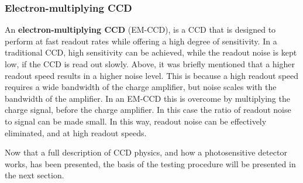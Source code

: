 \documentclass[../main.tex]{subfiles}
\begin{document}
	
	
	\subsubsection{Electron-multiplying CCD}
	An \textbf{electron-multiplying CCD} (EM-CCD), is a CCD that is designed to perform at fast readout rates while offering a high degree of sensitivity\cite{EM-CCD}. In a traditional CCD, high sensitivity can be achieved, while the readout noise is kept low, if the CCD is read out slowly. Above, it was briefly mentioned that a higher readout speed results in a higher noise level. This is because a high readout speed requires a wide bandwidth of the charge amplifier\cite{EM-CCD}, but noise scales with the bandwidth of the amplifier. In an EM-CCD this is overcome by multiplying the charge signal, before the charge amplifier\cite{EM-CCD}. In this case the ratio of readout noise to signal can be made  small. In this way, readout noise can be effectively eliminated, and at high readout speeds.
	
	
	Now that a full description of CCD physics, and how a photosensitive detector works, has been presented, the basis of the testing procedure will be presented in the next section.
	
\end{document}
